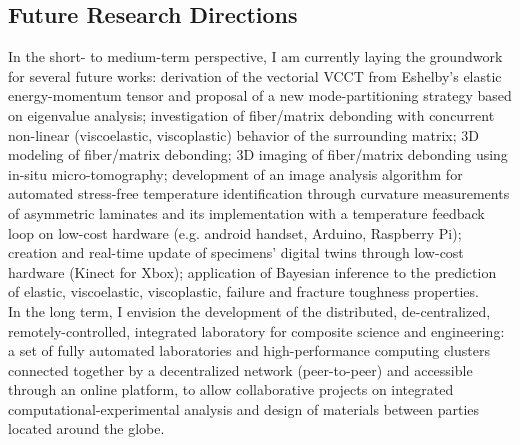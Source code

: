 \documentclass[
  a4paper, 
]{fortysecondscv}
\begin{document}
\subsection{Future Research Directions}
In the short- to medium-term perspective, I am currently laying the groundwork for several future works: derivation of the vectorial VCCT from Eshelby's elastic energy-momentum tensor and proposal of a new mode-partitioning strategy based on eigenvalue analysis; investigation of fiber/matrix debonding with concurrent non-linear (viscoelastic, viscoplastic) behavior of the surrounding matrix; 3D modeling of fiber/matrix debonding; 3D imaging of fiber/matrix debonding using in-situ micro-tomography; development of an image analysis algorithm for automated stress-free temperature identification through curvature measurements of asymmetric laminates and its implementation with a temperature feedback loop on low-cost hardware (e.g. android handset, Arduino, Raspberry Pi); creation and real-time update of specimens' digital twins through low-cost hardware (Kinect for Xbox); application of Bayesian inference to the prediction of elastic, viscoelastic, viscoplastic, failure and fracture toughness properties.\\
In the long term, I envision the development of the distributed, de-centralized, remotely-controlled, integrated laboratory for composite science and engineering: a set of fully automated laboratories and high-performance computing clusters connected together by a decentralized network (peer-to-peer) and accessible through an online platform, to allow collaborative projects on integrated computational-experimental analysis and design of materials between parties located around the globe.
\end{document}

